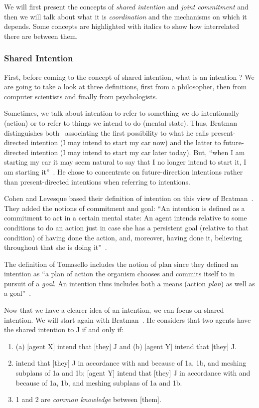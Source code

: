 \documentclass[a4paper,11pt,twoside]{StyleThese}
\begin{document}
We will first present the concepts of \textit{shared intention} and \textit{joint commitment} and then we will talk about what it is \textit{coordination} and the mechanisms on which it depends. Some concepts are highlighted with italics to show how interrelated there are between them.

\subsubsection{Shared Intention}
First, before coming to the concept of shared intention, what is an intention ? We are going to take a look at three definitions, first from a philosopher, then from computer scientists and finally from psychologists. 

Sometimes, we talk about intention to refer to something we do intentionally (action) or to refer to things we intend to do (mental state). Thus, Bratman distinguishes both~\cite{bratman_1984_two} associating the first possibility to what he calls present-directed intention (I may intend to start my car now) and the latter to future-directed intention (I may intend to start my car later today). But, ``when I am starting my car it may seem natural to say that I no longer intend to start it, I am starting it''~\cite[p.~379]{bratman_1984_two}. He chose to concentrate on future-direction intentions rather than present-directed intentions when referring to intentions. 

Cohen and Levesque based their definition of intention on this view of Bratman~\cite{cohen_1990_intention}. They added the notions of commitment and goal: ``An intention is defined as a commitment to act in a certain mental state: An agent intends relative to some conditions to do an action just in case she has a persistent goal (relative to that condition) of having done the action, and, moreover, having done it, believing throughout that she is doing it''~\cite[p.~496]{cohen_1991_teamwork}. 

The definition of Tomasello \etal{} includes the notion of plan since they defined an intention as ``a plan of action the organism chooses and commits itself to in pursuit of a \textit{goal}. An intention thus includes both a means (action \textit{plan}) as well as a goal''~\cite[p.~676]{tomasello_2005_understanding}. 

Now that we have a clearer idea of an intention, we can focus on shared intention. We will start again with Bratman~\cite{bratman_1993_shared}. He considers that two agents have the shared intention to J if and only if: 
\begin{enumerate}
	\item (a) [agent X] intend that [they] J and (b) [agent Y] intend that [they] J.
	\item\relax [agent X] intend that [they] J in accordance with and because of 1a, 1b, and meshing subplans of 1a and 1b; [agent Y] intend that [they] J in accordance with and because of 1a, 1b, and meshing subplans of 1a and 1b.
	\item 1 and 2 are \textit{common knowledge} between [them].
\end{enumerate}
\end{document}
